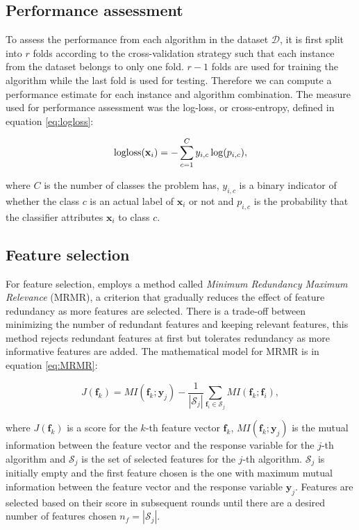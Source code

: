 \newpage
\subsection{Performance assessment}

To assess the performance from each algorithm in the dataset $\mathcal{D}$, it is first split into $r$ folds according to the cross-validation strategy such that each instance from the dataset belongs to only one fold. $r-1$ folds are used for training the algorithm while the last fold is used for testing. Therefore we can compute a performance estimate for each instance and algorithm combination. The measure used for performance assessment was the log-loss, or cross-entropy, defined in equation \ref{eq:logloss}:

\begin{equation} \label{eq:logloss}
	\logloss(\mathbf{x}_i) = - \sum_{c=1}^{C} y_{i, c} \log(p_{i, c}),
\end{equation}

where $C$ is the number of classes the problem has, $y_{i, c}$ is a binary indicator of whether the class $c$ is an actual label of $\mathbf{x}_i$ or not and $p_{i, c}$ is the probability that the classifier attributes $\mathbf{x}_i$ to class $c$.

\subsection{Feature selection}

For feature selection,  employs a method called \emph{Minimum Redundancy Maximum Relevance} (MRMR), a criterion that gradually reduces the effect of feature redundancy as more features are selected. There is a trade-off between minimizing the number of redundant features and keeping relevant features, this method rejects redundant features at first but tolerates redundancy as more informative features are added. The mathematical model for MRMR is in equation \ref{eq:MRMR}:

\begin{equation} \label{eq:MRMR}
	J(\mathbf{f}_k) = MI(\mathbf{f}_k; \mathbf{y}_j) - \frac{1}{|\mathcal{S}_j|} \sum_{\mathbf{f}_i \in \mathcal{S}_j} MI(\mathbf{f}_k; \mathbf{f}_i),
\end{equation}

where $J(\mathbf{f}_k)$ is a score for the $k$-th feature vector $\mathbf{f}_k$, $ MI(\mathbf{f}_k; \mathbf{y}_j)$ is the mutual information between the feature vector and the response variable for the $j$-th algorithm and $\mathcal{S}_j$ is the set of selected features for the $j$-th algorithm. $\mathcal{S}_j$ is initially empty and the first feature chosen is the one with maximum mutual information between the feature vector and the response variable $\mathbf{y}_j$. Features are selected based on their score in subsequent rounds until there are a desired number of features chosen $n_f = |\mathcal{S}_j|$.

